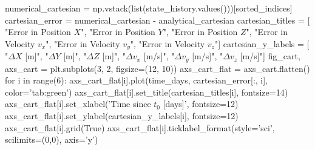 {}
\markdownRendererSectionEnd \markdownRendererSectionBegin
{}\markdownRendererInterblockSeparator
{}
\markdownRendererSectionEnd \markdownRendererSectionBegin
{}\markdownRendererInterblockSeparator
{}numerical_cartesian = np.vstack(list(state_history.values()))[sorted_indices]\markdownRendererInterblockSeparator
{}
\markdownRendererSectionEnd \markdownRendererSectionBegin
{}\markdownRendererInterblockSeparator
{}cartesian_error = numerical_cartesian - analytical_cartesian\markdownRendererInterblockSeparator
{}
\markdownRendererSectionEnd \markdownRendererSectionBegin
{}\markdownRendererInterblockSeparator
{}cartesian_titles = [ "Error in Position $X$", "Error in Position $Y$", "Error in Position $Z$", "Error in Velocity $v_x$", "Error in Velocity $v_y$", "Error in Velocity $v_z$"] cartesian_y_labels = [ "$\Delta X$ [m]", "$\Delta Y$ [m]", "$\Delta Z$ [m]", "$\Delta v_x$ [m/s]", "$\Delta v_y$ [m/s]", "$\Delta v_z$ [m/s]"]\markdownRendererInterblockSeparator
{}
\markdownRendererSectionEnd \markdownRendererSectionBegin
{}\markdownRendererInterblockSeparator
{}fig_cart, axs_cart = plt.subplots(3, 2, figsize=(12, 10))\markdownRendererInterblockSeparator
{}
\markdownRendererSectionEnd \markdownRendererSectionBegin
{}\markdownRendererInterblockSeparator
{}axs_cart_flat = axs_cart.flatten() for i in range(6): axs_cart_flat[i].plot(time_days, cartesian_error[:, i], color='tab:green') axs_cart_flat[i].set_title(cartesian_titles[i], fontsize=14) axs_cart_flat[i].set_xlabel('Time since $t_0$ [days]', fontsize=12) axs_cart_flat[i].set_ylabel(cartesian_y_labels[i], fontsize=12) axs_cart_flat[i].grid(True)\markdownRendererInterblockSeparator
{}
\markdownRendererSectionEnd \markdownRendererSectionBegin
{}\markdownRendererInterblockSeparator
{}axs_cart_flat[i].ticklabel_format(style='sci', scilimits=(0,0), axis='y')\markdownRendererInterblockSeparator
{}
\markdownRendererSectionEnd \markdownRendererSectionBegin
{}\markdownRendererInterblockSeparator
